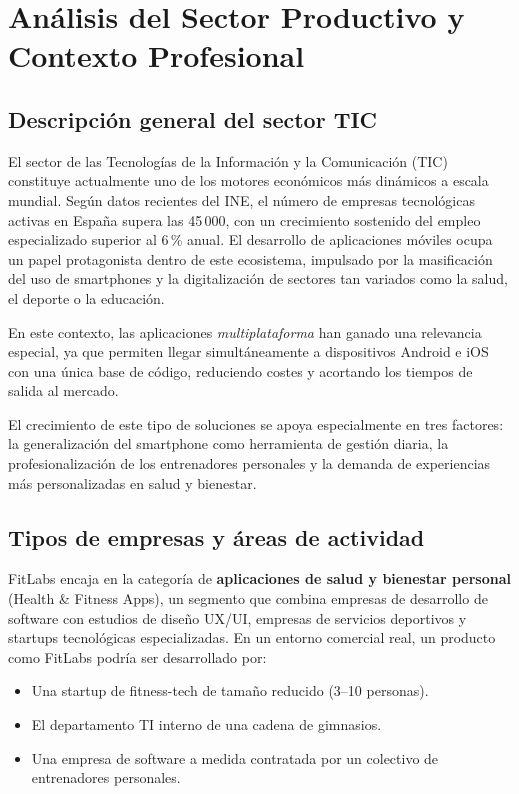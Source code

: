 \chapter{Análisis del Sector Productivo y Contexto Profesional}

\section{Descripción general del sector TIC}

El sector de las Tecnologías de la Información y la Comunicación (TIC) constituye actualmente uno de los motores económicos más dinámicos a escala mundial. Según datos recientes del INE, el número de empresas tecnológicas activas en España supera las 45\,000, con un crecimiento sostenido del empleo especializado superior al 6\,\% anual. El desarrollo de aplicaciones móviles ocupa un papel protagonista dentro de este ecosistema, impulsado por la masificación del uso de smartphones y la digitalización de sectores tan variados como la salud, el deporte o la educación.

En este contexto, las aplicaciones \textit{multiplataforma} han ganado una relevancia especial, ya que permiten llegar simultáneamente a dispositivos Android e iOS con una única base de código, reduciendo costes y acortando los tiempos de salida al mercado.

El crecimiento de este tipo de soluciones se apoya especialmente en tres factores: la generalización del smartphone como herramienta de gestión diaria, la profesionalización de los entrenadores personales y la demanda de experiencias más personalizadas en salud y bienestar.

\section{Tipos de empresas y áreas de actividad}

FitLabs encaja en la categoría de \textbf{aplicaciones de salud y bienestar personal} (Health \& Fitness Apps), un segmento que combina empresas de desarrollo de software con estudios de diseño UX/UI, empresas de servicios deportivos y startups tecnológicas especializadas. En un entorno comercial real, un producto como FitLabs podría ser desarrollado por:

\begin{itemize}
  \item Una startup de fitness-tech de tamaño reducido (3--10 personas).
  \item El departamento TI interno de una cadena de gimnasios.
  \item Una empresa de software a medida contratada por un colectivo de entrenadores personales.
\end{itemize}

